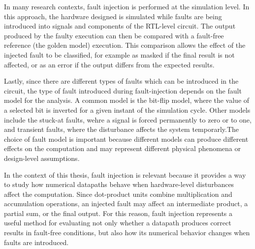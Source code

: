 In many research contexts, fault injection is performed at the simulation level. In this approach, the hardware designed is simulated while faults are being introduced into signals and components of the RTL-level circuit. The output produced by the faulty execution can then be compared with a fault-free reference (the golden model) execution. This comparison allows the effect of the injected fault  to be classified, for example as masked if the final result is not affected, or as an error if the output differs from the expected results.

Lastly, since there are different types of faults which can be introduced in the circuit, the type of fault introduced during fault-injection depends on the fault model for the analysis. A common  model is the bit-flip model, where the value of a selected bit is inverted for a given instant of the simulation cycle. Other models include the stuck-at faults, wehre a signal is forced permanently to zero or to one, and transient faults, where the disturbance affects the system temporarly.The choice of fault model is important because different models can produce different effects on the computation and may represent different physical phenomena or design-level assumptions.

In the context of this thesis, fault injection is relevant because it provides a way to study how numerical datapaths behave when hardware-level disturbances affect the computation. Since dot-product units combine multiplication and accumulation operations, an injected fault may affect an intermediate product, a partial sum, or the final output. For this reason, fault injection represents a useful method for evaluating not only whether a datapath produces correct results in fault-free conditions, but also how its numerical behavior changes when faults are introduced.


